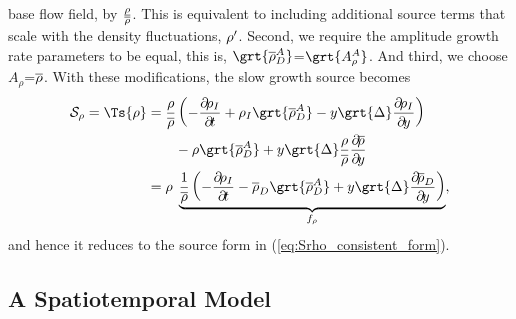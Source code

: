 {base flow field, by $\frac{\rho}{\overline{\rho}}$. This is equivalent to including
additional source terms that scale with the density fluctuations, $\rho'$.
Second, we require the amplitude growth rate parameters to be equal, this
is, $\grt{\mean{\rho}_D^A}$=$\grt{A_\rho^A}$. And third, we choose
$A_\rho$=$\overline{\rho}$. With these modifications, the slow growth source becomes
%
\begin{equation}
\begin{aligned}
\Ssd_\rho = \Ts{\rho}
   & = \frac{\rho}{\mean{\rho}} \left(- \pp{\rho_I}{t}
       + \rho_I \grt{\mean{\rho}_D^A}
       - y \grt{\Delta} \pp{\rho_I}{y} \right) \\
   & \qquad  -\rho \grt{\mean{\rho}_D^A}
             + y \grt{\Delta} \frac{\rho}{\mean{\rho}} \pp{\mean{\rho}}{y} \\
   & = \rho \;
       \underbrace{\frac{1}{\mean{\rho}} \left(- \pp{\rho_I}{t}
       - \mean{\rho}_D \grt{\mean{\rho}_D^A}
       + y \grt{\Delta} \pp{\mean{\rho}_D}{y} \right)}_{f_\rho}
,
\end{aligned}
\end{equation}
%
and hence it reduces to the source form in
(\ref{eq:Srho_consistent_form}).

\subsection{A Spatiotemporal Model}

}
